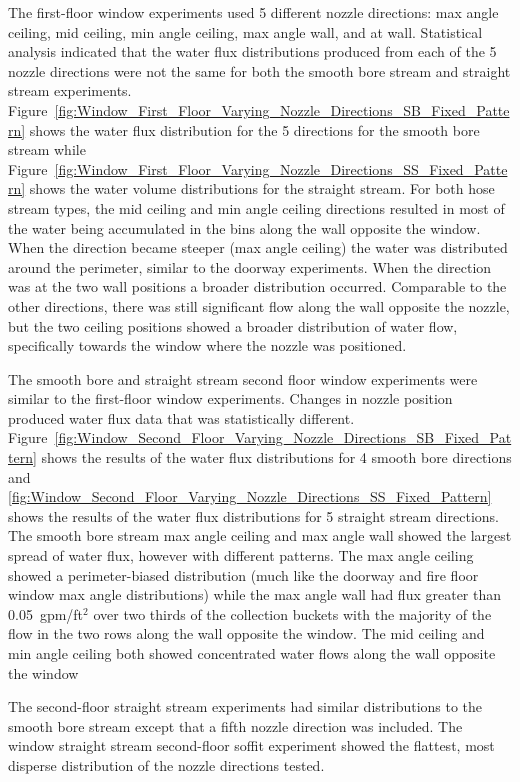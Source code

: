 \documentclass[12pt,oneside]{book}
\begin{document}
\clearpage

The first-floor window experiments used 5 different nozzle directions: max angle ceiling, mid ceiling, min angle ceiling, max angle wall, and at wall. Statistical analysis indicated that the water flux distributions produced from each of the 5 nozzle directions were not the same for both the smooth bore stream and straight stream experiments. Figure~\ref{fig:Window_First_Floor_Varying_Nozzle_Directions_SB_Fixed_Pattern} shows the water flux distribution for the 5 directions for the smooth bore stream while Figure~\ref{fig:Window_First_Floor_Varying_Nozzle_Directions_SS_Fixed_Pattern} shows the water volume distributions for the straight stream. For both hose stream types, the mid ceiling and min angle ceiling directions resulted in most of the water being accumulated in the bins along the wall opposite the window. When the direction became steeper (max angle ceiling) the water was distributed around the perimeter, similar to the doorway experiments. When the direction was at the two wall positions a broader distribution occurred. Comparable to the other directions, there was still significant flow along the wall opposite the nozzle, but the two ceiling positions showed a broader distribution of water flow, specifically towards the window where the nozzle was positioned.

The smooth bore and straight stream second floor window experiments were similar to the first-floor window experiments. Changes in nozzle position produced water flux data that was statistically different. Figure~\ref{fig:Window_Second_Floor_Varying_Nozzle_Directions_SB_Fixed_Pattern} shows the results of the water flux distributions for 4 smooth bore directions and \ref{fig:Window_Second_Floor_Varying_Nozzle_Directions_SS_Fixed_Pattern} shows the results of the water flux distributions for 5 straight stream directions. The smooth bore stream max angle ceiling and max angle wall showed the largest spread of water flux, however with different patterns. The max angle ceiling showed a perimeter-biased distribution (much like the doorway and fire floor window max angle distributions) while the max angle wall had flux greater than 0.05~gpm/ft$^2$ over two thirds of the collection buckets with the majority of the flow in the two rows along the wall opposite the window. The mid ceiling and min angle ceiling both showed concentrated water flows along the wall opposite the window

The second-floor straight stream experiments had similar distributions to the smooth bore stream except that a fifth nozzle direction was included. The window straight stream second-floor soffit experiment showed the flattest, most disperse distribution of the nozzle directions tested.
\end{document}
